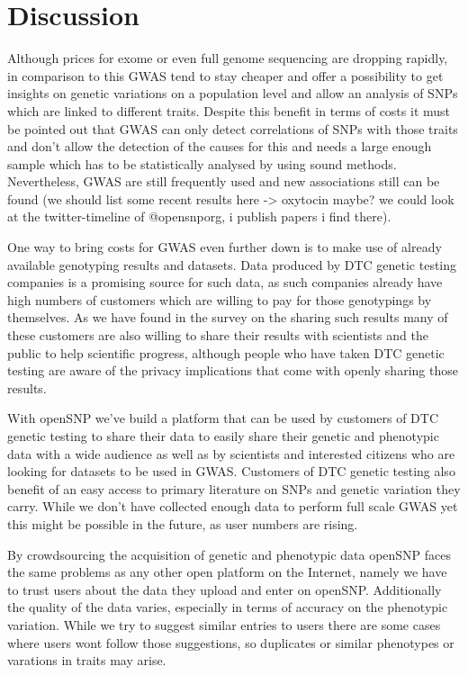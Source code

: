 \documentclass[10pt]{article}
\begin{document}
\section*{Discussion}
Although prices for exome or even full genome sequencing are dropping rapidly, in comparison to this GWAS tend to stay cheaper and offer a possibility to get insights on genetic variations on a population level and allow an analysis of SNPs which are linked to different traits. Despite this benefit in terms of costs it must be pointed out that GWAS can only detect correlations of SNPs with those traits and don't allow the detection of the causes for this and needs a large enough sample which has to be statistically analysed by using sound methods. Nevertheless, GWAS are still frequently used and new associations still can be found (we should list some recent results here -> oxytocin maybe? we could look at the twitter-timeline of @opensnporg, i publish papers i find there).

One way to bring costs for GWAS even further down is to make use of already available genotyping results and datasets. Data produced by DTC genetic testing companies is a promising source for such data, as such companies already have high numbers of customers which are willing to pay for those genotypings by themselves. As we have found in the survey on the sharing such results many of these customers are also willing to share their results with scientists and the public to help scientific progress, although people who have taken DTC genetic testing are aware of the privacy implications that come with openly sharing those results.      

With openSNP we've build a platform that can be used by customers of DTC genetic testing to share their data to easily share their genetic and phenotypic data with a wide audience as well as by scientists and interested citizens who are looking for datasets to be used in GWAS. Customers of DTC genetic testing also benefit of an easy access to primary literature on SNPs and genetic variation they carry. While we don't have collected enough data to perform full scale GWAS yet this might be possible in the future, as user numbers are rising. 

By crowdsourcing the acquisition of genetic and phenotypic data openSNP faces the same problems as any other open platform on the Internet, namely we have to trust users about the data they upload and enter on openSNP. Additionally the quality of the data varies, especially in terms of accuracy on the phenotypic variation. While we try to suggest similar entries to users there are some cases where users wont follow those suggestions, so duplicates or similar phenotypes or varations in traits may arise. 
\end{document}

